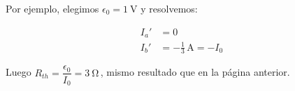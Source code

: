 \vspace{2mm}
Por ejemplo, elegimos $\epsilon_0=\qty{1}{\volt}$ y resolvemos:

\vspace{-3mm}
\begin{align*}
    I_a' &= 0\\[5pt]
    I_b' &= -\frac{1}{3}\,\si{\ampere} = -I_0
\end{align*}

Luego $R_{th} = \dfrac{\epsilon_0}{I_0} = \boxed{\qty{3}{\ohm}} \,$, mismo resultado que en la página anterior.





